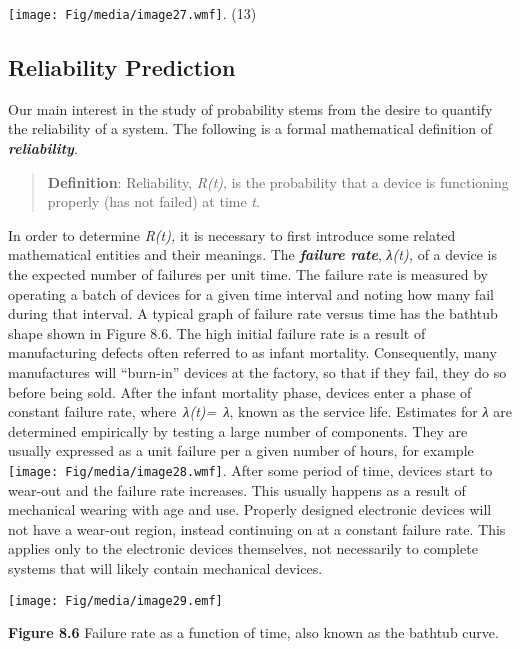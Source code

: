 \texttt{[image: Fig/media/image27.wmf]}. (13)

\subsection{Reliability Prediction}\label{reliability-prediction}

Our main interest in the study of probability stems from the desire to
quantify the reliability of a system. The following is a formal
mathematical definition of \emph{\textbf{reliability}}.

\begin{quote}
\textbf{Definition}: Reliability, \emph{R(t)}, is the probability that a
device is functioning properly (has not failed) at time \emph{t}.
\end{quote}

In order to determine \emph{R(t),} it is necessary to first introduce
some related mathematical entities and their meanings. The
\emph{\textbf{failure rate}}, \emph{λ(t),} of a device is the expected
number of failures per unit time. The failure rate is measured by
operating a batch of devices for a given time interval and noting how
many fail during that interval. A typical graph of failure rate versus
time has the bathtub shape shown in Figure 8.6. The high initial failure
rate is a result of manufacturing defects often referred to as infant
mortality. Consequently, many manufactures will ``burn-in'' devices at
the factory, so that if they fail, they do so before being sold. After
the infant mortality phase, devices enter a phase of constant failure
rate, where\emph{~λ(t)=~λ}, known as the service life. Estimates for
\emph{λ} are determined empirically by testing a large number of
components. They are usually expressed as a unit failure per a given
number of hours, for example \texttt{[image: Fig/media/image28.wmf]}.
After some period of time, devices start to wear-out and the failure
rate increases. This usually happens as a result of mechanical wearing
with age and use. Properly designed electronic devices will not have a
wear-out region, instead continuing on at a constant failure rate. This
applies only to the electronic devices themselves, not necessarily to
complete systems that will likely contain mechanical devices.

\texttt{[image: Fig/media/image29.emf]}

\textbf{Figure 8.6} Failure rate as a function of time, also known as
the bathtub curve.

